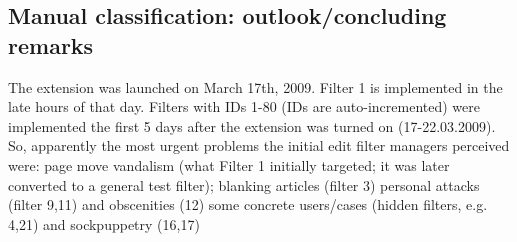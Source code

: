 \subsection{Manual classification: outlook/concluding remarks}
The extension was launched on March 17th, 2009.
Filter 1 is implemented in the late hours of that day.
Filters with IDs 1-80 (IDs are auto-incremented) were implemented the first 5 days after the extension was turned on (17-22.03.2009).
So, apparently the most urgent problems the initial edit filter managers perceived were:
page move vandalism (what Filter 1 initially targeted; it was later converted to a general test filter);
blanking articles (filter 3)
personal attacks (filter 9,11) and obscenities (12)
some concrete users/cases (hidden filters, e.g. 4,21) and sockpuppetry (16,17)

